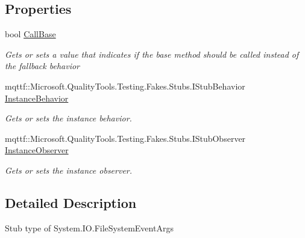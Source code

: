 \subsection*{Properties}
\begin{DoxyCompactItemize}
\item 
bool \hyperlink{class_system_1_1_i_o_1_1_fakes_1_1_stub_file_system_event_args_a467b7b03b2d08059b69caf3acaae03f4}{Call\-Base}
\begin{DoxyCompactList}\small\item\em Gets or sets a value that indicates if the base method should be called instead of the fallback behavior\end{DoxyCompactList}\item 
mqttf\-::\-Microsoft.\-Quality\-Tools.\-Testing.\-Fakes.\-Stubs.\-I\-Stub\-Behavior \hyperlink{class_system_1_1_i_o_1_1_fakes_1_1_stub_file_system_event_args_ad6c4decbe9be1e0c57bb203c2a6dc021}{Instance\-Behavior}
\begin{DoxyCompactList}\small\item\em Gets or sets the instance behavior.\end{DoxyCompactList}\item 
mqttf\-::\-Microsoft.\-Quality\-Tools.\-Testing.\-Fakes.\-Stubs.\-I\-Stub\-Observer \hyperlink{class_system_1_1_i_o_1_1_fakes_1_1_stub_file_system_event_args_aa27b604be2c8a26e26654521d8f5c860}{Instance\-Observer}
\begin{DoxyCompactList}\small\item\em Gets or sets the instance observer.\end{DoxyCompactList}\end{DoxyCompactItemize}


\subsection{Detailed Description}
Stub type of System.\-I\-O.\-File\-System\-Event\-Args



